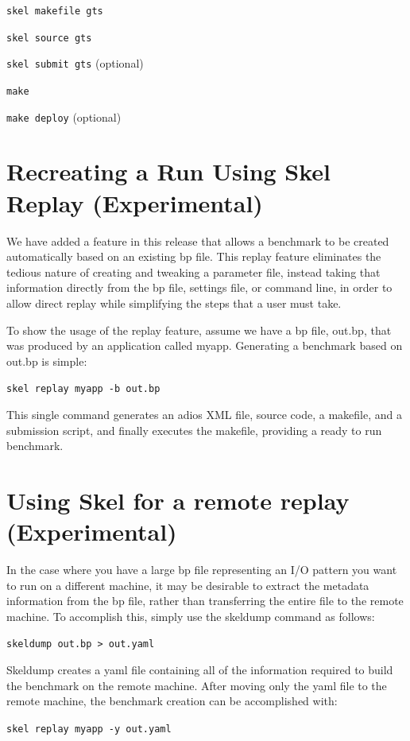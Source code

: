 {\tt skel makefile gts}

{\tt skel source gts}

{\tt skel submit gts} (optional)

{\tt make}

{\tt make deploy} (optional)



\section{Recreating a Run Using Skel Replay (Experimental)}
We have added a feature in this release that allows a benchmark to be created
automatically based on an existing bp file. This replay feature eliminates the
tedious nature of creating and tweaking a parameter file, instead taking that 
information directly from the bp file, settings file, or command line, in order
to allow direct replay while simplifying the steps that a user must take.

To show the usage of the replay feature, assume we have a bp file, out.bp,
that was produced by an application called myapp. Generating a benchmark based on out.bp is simple: 

{\tt skel replay myapp -b out.bp}

This single command generates an adios XML file, source code, a makefile, and a submission script, and finally executes the makefile, providing a ready to run benchmark.

\section{Using Skel for a remote replay (Experimental)}

In the case where you have a large bp file representing an I/O pattern you want to run
on a different machine, it may be desirable to extract the metadata information from the
bp file, rather than transferring the entire file to the remote machine. To
accomplish this, simply use the skeldump command as follows:

{\tt skeldump out.bp > out.yaml}

Skeldump creates a yaml file containing all of the information required to build the
benchmark on the remote machine. After moving only the yaml file to the remote machine,
the benchmark creation can be accomplished with:

{\tt skel replay myapp -y out.yaml}

